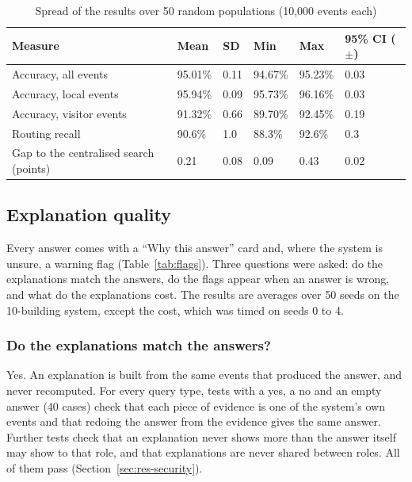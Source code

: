 \documentclass[12pt,a4paper,oneside]{report}
\begin{document}
\begin{table}[htbp]
\centering
\caption{Spread of the results over 50 random populations (10,000 events each)}\label{tab:seeds}
{\small\setlength{\tabcolsep}{4pt}\renewcommand{\arraystretch}{1.2}
\begin{tabular}{|p{3.6cm}|p{1.9cm}|p{1.9cm}|p{1.9cm}|p{1.9cm}|p{2.4cm}|}\hline
\textbf{Measure} & \textbf{Mean} & \textbf{SD} & \textbf{Min} & \textbf{Max} & \textbf{95\% CI ($\pm$)}\\\hline
Accuracy, all events & 95.01\% & 0.11 & 94.67\% & 95.23\% & 0.03\\\hline
Accuracy, local events & 95.94\% & 0.09 & 95.73\% & 96.16\% & 0.03\\\hline
Accuracy, visitor events & 91.32\% & 0.66 & 89.70\% & 92.45\% & 0.19\\\hline
Routing recall & 90.6\% & 1.0 & 88.3\% & 92.6\% & 0.3\\\hline
Gap to the centralised search (points) & 0.21 & 0.08 & 0.09 & 0.43 & 0.02\\\hline
\end{tabular}}
\end{table}

\subsection{Explanation quality}\label{sec:res-expl}
Every answer comes with a ``Why this answer'' card and, where the system is unsure, a warning flag (Table~\ref{tab:flags}). Three questions were asked: do the explanations match the answers, do the flags appear when an answer is wrong, and what do the explanations cost. The results are averages over 50 seeds on the 10-building system, except the cost, which was timed on seeds 0 to 4.

\subsubsection{Do the explanations match the answers?}
Yes. An explanation is built from the same events that produced the answer, and never recomputed. For every query type, tests with a yes, a no and an empty answer (40 cases) check that each piece of evidence is one of the system's own events and that redoing the answer from the evidence gives the same answer. Further tests check that an explanation never shows more than the answer itself may show to that role, and that explanations are never shared between roles. All of them pass (Section~\ref{sec:res-security}).
\end{document}
